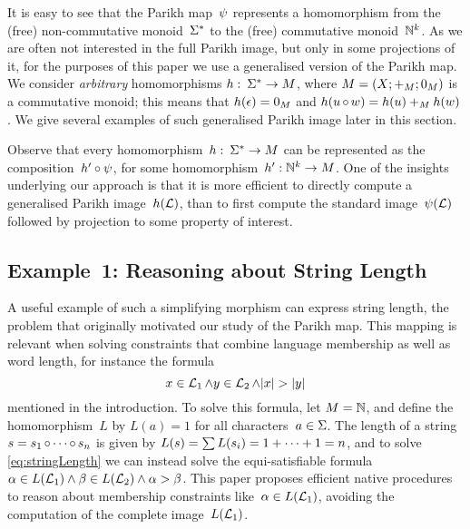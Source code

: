 \documentclass[acmsmall,review,anonymous,screen]{acmart}\settopmatter{printfolios=true,printccs=false,printacmref=true}
\theoremstyle{definition}
\begin{document}
It is easy to see that the Parikh map~$\operatorname{\psi}$ represents a
homomorphism from the (free) non-commutative monoid~$\Sigma^*$ to the
(free) commutative monoid~$\mathbb{N}^k$. As we are often not
interested in the full Parikh image, but only in some projections of
it, for the purposes of this paper we use a generalised version of the
Parikh map. We consider \emph{arbitrary} homomorphisms
$h:\: \Sigma^* \to M$, where
$M = \left(X;+_{M};0_{M}\right)$ is a commutative
monoid; this means that $h(\epsilon) = 0_{M}$ and
$h(u \operatorname{\circ} w) = h(u) +_{M} h(w)$. We give several
examples of such generalised Parikh image later in this section.

Observe that every homomorphism~$h:\: \Sigma^* \to M$ can be
represented as the composition~$h' \circ \operatorname{\psi}$, for some
homomorphism~$h' : \mathbb{N}^k \to M$. One of the insights underlying our
approach is that it is more efficient to directly compute a
generalised Parikh image~$h(\operatorname{\mathcal{L}})$, than to first compute the
standard image~$\operatorname{\psi}(\operatorname{\mathcal{L}})$ followed by projection to
some property of interest.


\subsection{Example~1: Reasoning about String Length}

A useful example of such a simplifying morphism can express string
length, the problem that originally motivated our study of the Parikh
map. This mapping is relevant when solving constraints that combine
language membership as well as word length, for instance the formula
\begin{equation}\label{eq:stringLength}
x \in \operatorname{\mathcal{L}}_1 \wedge y \in \operatorname{\mathcal{L}}_2 \wedge |x| > |y|
\end{equation}
mentioned in the introduction. To solve this formula, let
$M = \mathbb{N}$, and define the homomorphism~$L$ by $L(a) = 1$
for all characters~$a \in \Sigma$. The length of a string
$s = s_1 \operatorname{\circ} \cdots \operatorname{\circ} s_n$ is given by
$L(s) = \sum L(s_i) = 1 + \cdots + 1 = n$, and to solve
\eqref{eq:stringLength} we can instead solve the equi-satisfiable
formula~$\alpha \in L(\operatorname{\mathcal{L}}_1) \wedge \beta \in L(\operatorname{\mathcal{L}}_2)
\wedge \alpha > \beta$. This paper proposes efficient native
procedures to reason about membership constraints
like~$\alpha \in L(\operatorname{\mathcal{L}}_1)$, avoiding the computation of
the complete image~$L(\operatorname{\mathcal{L}}_1)$.
\end{document}
